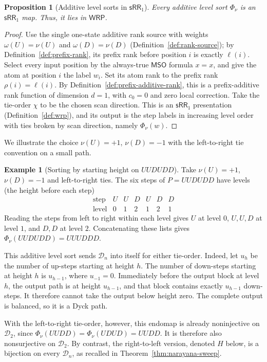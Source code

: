 \documentclass[11pt]{article}
\newtheorem{proposition}[theorem]{Proposition}
\theoremstyle{definition}
\newtheorem{example}[theorem]{Example}
\newcommand{\D}{\mathcal D}
\newcommand{\WRP}{\mathsf{WRP}}
\newcommand{\SWR}{\mathsf{sRR}_1}
\newcommand{\MSO}{\mathsf{MSO}}
\begin{document}
\begin{proposition}[Additive level sorts in $\SWR$]
\label{prop:alw-sweep-swr}
Every additive level sort $\Phi_\nu$ is an $\SWR$ map.  Thus, it
lies in $\WRP$.
\end{proposition}

\begin{proof}
Use the single one-state additive rank source with weights $\omega(U)=\nu(U)$
and $\omega(D)=\nu(D)$ (Definition~\ref{def:rank-source}); by
Definition~\ref{def:prefix-rank}, its prefix rank
before position $i$ is exactly $\ell(i)$.  Select every input position by the
always-true $\MSO$ formula $x=x$, and give the atom at position $i$ the label
$w_i$.  Set its atom rank to the prefix rank $\rho(i)=\ell(i)$.  By
Definition~\ref{def:prefix-additive-rank}, this is a prefix-additive rank
function of dimension $d=1$, with $c_0=0$ and zero local correction.  Take the
tie-order $\chi$ to be the chosen scan direction.  This is an $\SWR$
presentation (Definition~\ref{def:wrp}), and its output is the step labels in
increasing level order with ties broken by scan direction, namely
$\Phi_\nu(w)$.
\end{proof}

We illustrate the choice $\nu(U)=+1$, $\nu(D)=-1$ with the left-to-right tie
convention on a small path.

\begin{example}[Sorting by starting height on $UUDUDD$]\label{ex:height-sweep}
Take $\nu(U)=+1$, $\nu(D)=-1$ and left-to-right ties.  The six steps of
$P=UUDUDD$ have levels (the height before each step)
\[
   \begin{array}{c|cccccc}
     \text{step}  & U & U & D & U & D & D\\\hline
     \text{level} & 0 & 1 & 2 & 1 & 2 & 1
   \end{array}
\]
Reading the steps from left to right within each level gives $U$ at level $0$,
$U,U,D$ at level $1$, and $D,D$ at level $2$.  Concatenating these lists gives
$\Phi_\nu(UUDUDD)=UUUDDD$.

This additive level sort sends $\D_n$ into itself for either tie-order.
Indeed, let $u_h$ be the number of up-steps starting at height $h$.  The number of
down-steps starting at height $h$ is $u_{h-1}$, where $u_{-1}=0$.  Immediately
before the output block at level $h$, the output path is at height $u_{h-1}$,
and that block contains exactly $u_{h-1}$ down-steps.  It therefore cannot take
the output below height zero.  The complete output is balanced, so it is a
Dyck path.

With the left-to-right tie-order, however, this endomap is already
noninjective on $\D_2$, since
$\Phi_\nu(UUDD)=\Phi_\nu(UDUD)=UUDD$.
It is therefore also nonsurjective on $\D_2$.  By contrast, the right-to-left
version, denoted $H$ below, is a bijection on every $\D_n$, as recalled in
Theorem~\ref{thm:narayana-sweep}.
\end{example}
\end{document}

